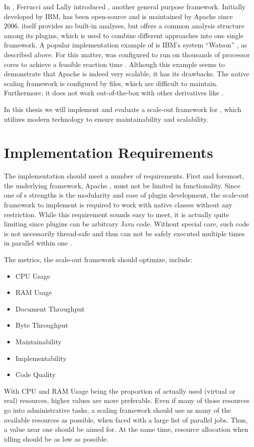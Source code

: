 In \cite{ferrucci2004uima}, Ferrucci and Lally introduced \uima{}, another general purpose \nlp{} framework. Initially developed by IBM, \uima{} has been open-source and is maintained by Apache since 2006. \uima{} itself provides no built-in \nlp{} analyses, but offers a common analysis structure among its plugins, which is used to combine different \nlp{} approaches into one single framework. A popular implementation example of \uima{} is IBM's \qa{} system ``Watson'' \cite{ferrucci2012introduction,epstein2012making}, as described above. For this matter, \uima{} was configured to run on thousands of processor cores to achieve a feasible reaction time \cite{epstein2012making}. Although this example seems to demonstrate that Apache \uima{} is indeed very scalable, it has its drawbacks. The native \uima{} scaling framework \uimaas{} is configured by \xml{} files, which are difficult to maintain. Furthermore, it does not work out-of-the-box with other \uima{} derivatives like \uimafit{}. 

In this thesis we will implement and evaluate a scale-out framework for \uima{}, which utilizes modern technology to ensure maintainability and scalability.

\section{Implementation Requirements}
\label{sec:requirements}
The implementation should meet a number of requirements. First and foremost, the underlying framework, Apache \uima{}, must not be limited in functionality. Since one of \uima{}s strengths is the modularity and ease of plugin development, the scale-out framework to implement is required to work with native \uima{} classes without any restriction. While this requirement sounds easy to meet, it is actually quite limiting since \uima{} plugins can be arbitrary Java code. Without special care, such code is not necessarily thread-safe and thus can not be safely executed multiple times in parallel within one \jvm{}.

The metrics, the scale-out framework should optimize, include:
\begin{itemize}
\item CPU Usage
\item RAM Usage
\item Document Throughput
\item Byte Throughput
\item Maintainability
\item Implementability
\item Code Quality
\end{itemize}
With CPU and RAM Usage being the proportion of actually used (virtual or real) resources, higher values are more preferable. Even if many of those resources go into administrative tasks, a scaling framework should use as many of the available resources as possible, when faced with a large list of parallel jobs. Thus, a value near one should be aimed for. At the same time, resource allocation when idling should be as low as possible.

